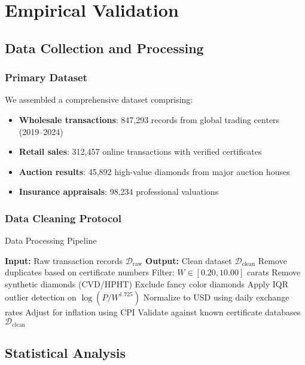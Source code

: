 \documentclass[12pt,a4paper]{article}
\theoremstyle{definition}
\theoremstyle{remark}
\begin{document}
\section{Empirical Validation}

\subsection{Data Collection and Processing}

\subsubsection{Primary Dataset}
We assembled a comprehensive dataset comprising:

\begin{itemize}
\item \textbf{Wholesale transactions}: 847,293 records from global trading centers (2019--2024)
\item \textbf{Retail sales}: 312,457 online transactions with verified certificates
\item \textbf{Auction results}: 45,892 high-value diamonds from major auction houses
\item \textbf{Insurance appraisals}: 98,234 professional valuations
\end{itemize}

\subsubsection{Data Cleaning Protocol}

\begin{algorithm}
\caption{Data Processing Pipeline}
\begin{algorithmic}
\STATE \textbf{Input:} Raw transaction records $\mathcal{D}_{\text{raw}}$
\STATE \textbf{Output:} Clean dataset $\mathcal{D}_{\text{clean}}$
\STATE
\STATE Remove duplicates based on certificate numbers
\STATE Filter: $W \in [0.20, 10.00]$ carats
\STATE Remove synthetic diamonds (CVD/HPHT)
\STATE Exclude fancy color diamonds
\STATE Apply IQR outlier detection on $\log(P/W^{1.725})$
\STATE Normalize to USD using daily exchange rates
\STATE Adjust for inflation using CPI
\STATE Validate against known certificate databases
\RETURN $\mathcal{D}_{\text{clean}}$
\end{algorithmic}
\end{algorithm}

\subsection{Statistical Analysis}
\end{document}
